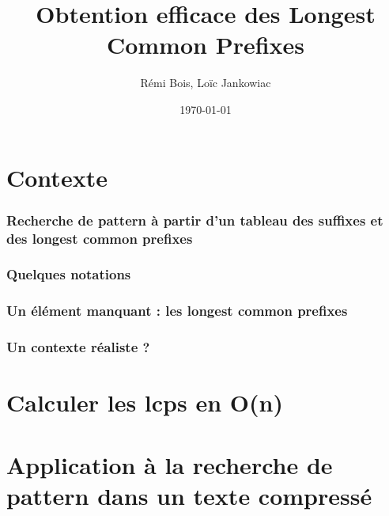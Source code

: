 \documentclass[10pt]{beamer}
\title{Obtention efficace des Longest Common Prefixes}
\author{Rémi Bois, Loïc Jankowiac}
\date{\today}
\begin{document}
\begin{frame}
  \maketitle

\end{frame}

\begin{frame}
  \tableofcontents
\end{frame}

\section{Contexte}
\label{sec:context}



\begin{frame}
  \frametitle{Recherche de pattern à partir d'un tableau des suffixes
    et des longest common prefixes}
\end{frame}

\begin{frame}
  \frametitle{Quelques notations}
\end{frame}

\begin{frame}
  \frametitle{Un élément manquant : les longest common prefixes}
\end{frame}


\begin{frame}
  \frametitle{Un contexte réaliste ?}
\end{frame}

\section{Calculer les lcps en O(n)}
\label{sec:algo}



\section{Application à la recherche de pattern dans un texte compressé}
\label{sec:appcompress}
\end{document}
